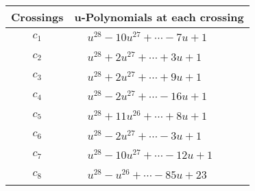 \documentclass[1p]{elsarticle_modified}
\theoremstyle{definition}
\begin{document}
\begin{tabular}{m{50pt}|m{274pt}}
Crossings & \hspace{64pt}u-Polynomials at each crossing \\
\hline $$\begin{aligned}c_{1}\end{aligned}$$&$\begin{aligned}
&u^{28}-10 u^{27}+\cdots-7 u+1
\end{aligned}$\\
\hline $$\begin{aligned}c_{2}\end{aligned}$$&$\begin{aligned}
&u^{28}+2 u^{27}+\cdots+3 u+1
\end{aligned}$\\
\hline $$\begin{aligned}c_{3}\end{aligned}$$&$\begin{aligned}
&u^{28}+2 u^{27}+\cdots+9 u+1
\end{aligned}$\\
\hline $$\begin{aligned}c_{4}\end{aligned}$$&$\begin{aligned}
&u^{28}-2 u^{27}+\cdots-16 u+1
\end{aligned}$\\
\hline $$\begin{aligned}c_{5}\end{aligned}$$&$\begin{aligned}
&u^{28}+11 u^{26}+\cdots+8 u+1
\end{aligned}$\\
\hline $$\begin{aligned}c_{6}\end{aligned}$$&$\begin{aligned}
&u^{28}-2 u^{27}+\cdots-3 u+1
\end{aligned}$\\
\hline $$\begin{aligned}c_{7}\end{aligned}$$&$\begin{aligned}
&u^{28}-10 u^{27}+\cdots-12 u+1
\end{aligned}$\\
\hline $$\begin{aligned}c_{8}\end{aligned}$$&$\begin{aligned}
&u^{28}- u^{26}+\cdots-85 u+23
\end{aligned}$\\

\end{tabular}
\end{document}
